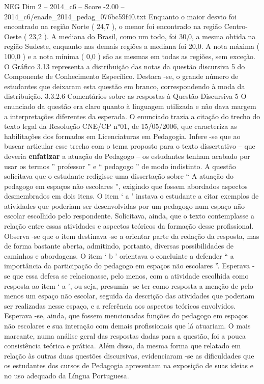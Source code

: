 \begin{textsample}{NEG Dim 2 – 2014\_c6 – Score -2.00 – 2014\_c6/enade\_2014\_pedag\_076bc59f40.txt}
Enquanto o maior desvio foi encontrado na região Norte ( 24,7 ), o menor foi encontrado na região Centro-Oeste ( 23,2 ).
A mediana do Brasil, como um todo, foi 30,0, a mesma obtida na região Sudeste, enquanto nas demais regiões a mediana foi 20,0.
A nota máxima ( 100,0 ) e a nota mínima ( 0,0 ) são as mesmas em todas as regiões, sem exceção.
O Gráfico 3.13 representa a distribuição das notas da questão discursiva 5 do Componente de Conhecimento Específico.
Destaca -se, o grande número de estudantes que deixaram esta questão em branco, correspondendo à moda da distribuição. 3.3.2.6 Comentários sobre as respostas à Questão Discursiva 5 O enunciado da questão era claro quanto à linguagem utilizada e não dava margem a interpretações diferentes da esperada.
O enunciado trazia a citação do trecho do texto legal da Resolução CNE/CP n{\EmojiFont °}01, de 15/05/2006, que caracteriza as habilitações dos formados em Licenciaturas em Pedagogia.
Infere -se que ao buscar articular esse trecho com o tema proposto para o texto dissertativo – que deveria \textbf{enfatizar} a atuação do Pedagogo – os estudantes tenham acabado por usar os termos ” professor ” e “ pedagogo ” de modo indistinto.
A questão solicitava que o estudante redigisse uma dissertação sobre “ A atuação do pedagogo em espaços não escolares ”, exigindo que fossem abordados aspectos desmembrados em dois itens.
O item ‘ a ’ instava o estudante a citar exemplos de atividades que poderiam ser desenvolvidas por um pedagogo num espaço não escolar escolhido pelo respondente.
Solicitava, ainda, que o texto contemplasse a relação entre essas atividades e aspectos teóricos da formação desse profissional.
Observa -se que o item destinava -se a orientar parte da redação da resposta, mas de forma bastante aberta, admitindo, portanto, diversas possibilidades de caminhos e abordagens.
O item ‘ b ’ orientava o concluinte a defender “ a importância da participação do pedagogo em espaços não escolares ”.
Esperava -se que essa defesa se relacionasse, pelo menos, com a atividade escolhida como resposta ao item ‘ a ’, ou seja, presumia -se ter como resposta a menção de pelo menos um espaço não escolar, seguida da descrição das atividades que poderiam ser realizadas nesse espaço, e a referência aos aspectos teóricos envolvidos.
Esperava -se, ainda, que fossem mencionadas funções do pedagogo em espaços não escolares e sua interação com demais profissionais que lá atuariam.
O mais marcante, numa análise geral das respostas dadas para a questão, foi a pouca consistência teórica e prática.
Além disso, da mesma forma que relatado em relação às outras duas questões discursivas, evidenciaram -se as dificuldades que os estudantes dos cursos de Pedagogia apresentam na exposição de suas ideias e no uso adequado da Língua Portuguesa.

\end{textsample}
